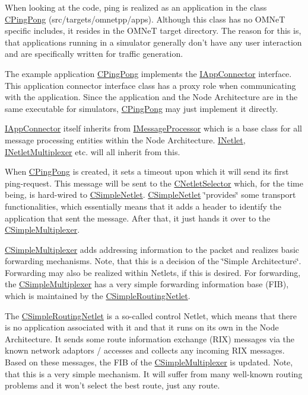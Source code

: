 When looking at the code, ping is realized as an application in the class \hyperlink{classCPingPong}{CPingPong} (src/targets/omnetpp/apps). Although this class has no OMNeT specific includes, it resides in the OMNeT target directory. The reason for this is, that applications running in a simulator generally don't have any user interaction and are specifically written for traffic generation.

The example application \hyperlink{classCPingPong}{CPingPong} implements the \hyperlink{classIAppConnector}{IAppConnector} interface. This application connector interface class has a proxy role when communicating with the application. Since the application and the Node Architecture are in the same executable for simulators, \hyperlink{classCPingPong}{CPingPong} may just implement it directly.

\hyperlink{classIAppConnector}{IAppConnector} itself inherits from \hyperlink{classIMessageProcessor}{IMessageProcessor} which is a base class for all message processing entities within the Node Architecture. \hyperlink{classINetlet}{INetlet}, \hyperlink{classINetletMultiplexer}{INetletMultiplexer} etc. will all inherit from this.

When \hyperlink{classCPingPong}{CPingPong} is created, it sets a timeout upon which it will send its first ping-request. This message will be sent to the \hyperlink{classCNetletSelector}{CNetletSelector} which, for the time being, is hard-wired to \hyperlink{classCSimpleNetlet}{CSimpleNetlet}. \hyperlink{classCSimpleNetlet}{CSimpleNetlet} \char`\"{}provides\char`\"{} some transport functionalities, which essentially means that it adds a header to identify the application that sent the message. After that, it just hands it over to the \hyperlink{classCSimpleMultiplexer}{CSimpleMultiplexer}.

\hyperlink{classCSimpleMultiplexer}{CSimpleMultiplexer} adds addressing information to the packet and realizes basic forwarding mechanisms. Note, that this is a decision of the \char`\"{}Simple Architecture\char`\"{}. Forwarding may also be realized within Netlets, if this is desired. For forwarding, the \hyperlink{classCSimpleMultiplexer}{CSimpleMultiplexer} has a very simple forwarding information base (FIB), which is maintained by the \hyperlink{classCSimpleRoutingNetlet}{CSimpleRoutingNetlet}.

The \hyperlink{classCSimpleRoutingNetlet}{CSimpleRoutingNetlet} is a so-called control Netlet, which means that there is no application associated with it and that it runs on its own in the Node Architecture. It sends some route information exchange (RIX) messages via the known network adaptors / accesses and collects any incoming RIX messages. Based on these messages, the FIB of the \hyperlink{classCSimpleMultiplexer}{CSimpleMultiplexer} is updated. Note, that this is a very simple mechanism. It will suffer from many well-known routing problems and it won't select the best route, just any route.

